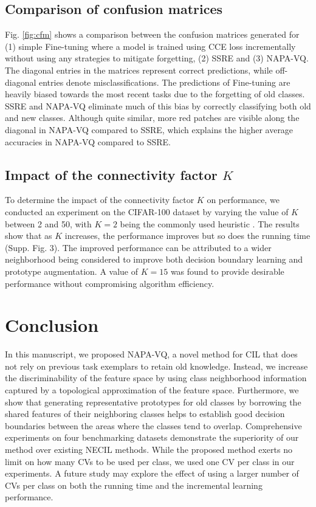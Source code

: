\documentclass[10pt,twocolumn,letterpaper]{article}
\begin{document}
\subsection{Comparison of confusion matrices}

Fig. \ref{fig:cfm} shows a comparison between the confusion matrices generated for (1) simple Fine-tuning where a model is trained using CCE loss incrementally without using any strategies to mitigate forgetting, (2) SSRE and (3) NAPA-VQ. The diagonal entries in the matrices represent correct predictions, while off-diagonal entries denote misclassifications. The predictions of Fine-tuning are heavily biased towards the most recent tasks due to the forgetting of old classes. SSRE and NAPA-VQ eliminate much of this bias by correctly classifying both old and new classes. Although quite similar, more red patches are visible along the diagonal in NAPA-VQ compared to SSRE, which explains the higher average accuracies in NAPA-VQ compared to SSRE.


\subsection{Impact of the connectivity factor $K$}

 To determine the impact of the connectivity factor $K$ on performance, we conducted an experiment on the CIFAR-100 dataset by varying the value of $K$ between 2 and 50, with $K = 2$ being the commonly used heuristic \cite{ThomasMartinetzandKlausSchulten1991ATopologies, Fritzke1994ATopologies}. The results show that as $K$ increases, the performance improves but so does the running time (Supp. Fig. 3). The improved performance 
 can be attributed to a wider neighborhood being considered to
improve both decision boundary learning and prototype augmentation. A value of $ K = 15$ was found to provide desirable performance without compromising algorithm efficiency.

\section{Conclusion}
In this manuscript, we proposed NAPA-VQ, a novel method for CIL that does not rely on previous task exemplars to retain old knowledge. Instead, we increase the discriminability of the feature space by using class neighborhood information captured by a topological approximation of the feature space. Furthermore, we show that generating representative prototypes for old classes by borrowing the shared features of their neighboring classes helps to establish good decision boundaries between the areas where the classes tend to overlap. Comprehensive experiments on four benchmarking datasets demonstrate the superiority of our method over existing NECIL methods. While the proposed method exerts no limit on how many CVs to be used per class, we used one CV per class in our experiments. A future study may explore the effect of using a larger number of CVs per class on both the running time and the incremental learning performance. 
\end{document}
